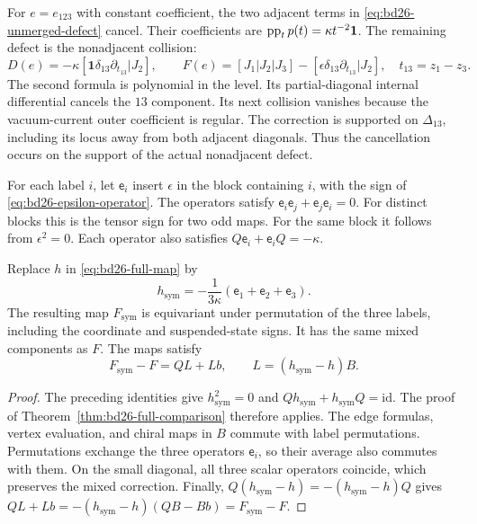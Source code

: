 For $e=e_{123}$ with constant coefficient, the two adjacent terms in \eqref{eq:bd26-unmerged-defect} cancel.
Their coefficients are $\operatorname{pp}_t p(t)=\kappa t^{-2}\mathbf1$.
The remaining defect is the nonadjacent collision:
\begin{equation}\label{eq:bd26-constant-word}
 D(e)=-\kappa[\mathbf1\delta_{13}\partial_{t_{13}}|J_2],
 \qquad
 F(e)=[J_1|J_2|J_3]-[\epsilon\delta_{13}\partial_{t_{13}}|J_2],
 \quad t_{13}=z_1-z_3.
\end{equation}
The second formula is polynomial in the level.
Its partial-diagonal internal differential cancels the $13$ component.
Its next collision vanishes because the vacuum-current outer coefficient is regular.
The correction is supported on $\Delta_{13}$, including its locus away from both adjacent diagonals.
Thus the cancellation occurs on the support of the actual nonadjacent defect.

For each label $i$, let $\mathsf e_i$ insert $\epsilon$ in the block containing $i$, with the sign of \eqref{eq:bd26-epsilon-operator}.
The operators satisfy $\mathsf e_i\mathsf e_j+\mathsf e_j\mathsf e_i=0$.
For distinct blocks this is the tensor sign for two odd maps.
For the same block it follows from $\epsilon^2=0$.
Each operator also satisfies $Q\mathsf e_i+\mathsf e_iQ=-\kappa$.

\begin{corollary}\label{cor:bd26-equivariant}
Replace $h$ in \eqref{eq:bd26-full-map} by
\[
 h_{\mathrm{sym}}=-\frac1{3\kappa}(\mathsf e_1+\mathsf e_2+\mathsf e_3).
\]
The resulting map $F_{\mathrm{sym}}$ is equivariant under permutation of the three labels, including the coordinate and suspended-state signs.
It has the same mixed components as $F$.
The maps satisfy
\[
 F_{\mathrm{sym}}-F=QL+Lb,
 \qquad L=(h_{\mathrm{sym}}-h)B.
\]
\end{corollary}
\begin{proof}
The preceding identities give $h_{\mathrm{sym}}^2=0$ and
$Qh_{\mathrm{sym}}+h_{\mathrm{sym}}Q=\mathrm{id}$.
The proof of Theorem~\ref{thm:bd26-full-comparison} therefore applies.
The edge formulas, vertex evaluation, and chiral maps in $B$ commute with label permutations.
Permutations exchange the three operators $\mathsf e_i$, so their average also commutes with them.
On the small diagonal, all three scalar operators coincide, which preserves the mixed correction.
Finally, $Q(h_{\mathrm{sym}}-h)=-(h_{\mathrm{sym}}-h)Q$ gives
$QL+Lb=-(h_{\mathrm{sym}}-h)(QB-Bb)=F_{\mathrm{sym}}-F$.
\end{proof}

